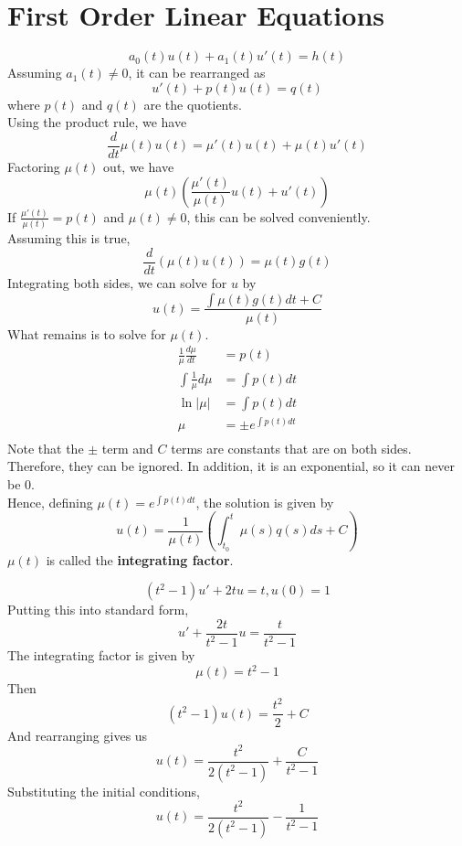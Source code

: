 \documentclass[12pt]{article}
\begin{document}
\section{First Order Linear Equations}
$$a_0(t)u(t) + a_1(t)u'(t) = h(t)$$
Assuming $a_1(t) \neq 0$, it can be rearranged as
$$u'(t) + p(t)u(t) = q(t)$$
where $p(t)$ and $q(t)$ are the quotients. \\
Using the product rule, we have
$$\frac{d}{dt} \mu(t)u(t) = \mu'(t)u(t) + \mu(t)u'(t)$$
Factoring $\mu(t)$ out, we have
$$\mu(t)\left(\frac{\mu'(t)}{\mu(t)}u(t) + u'(t)\right)$$
If $\frac{\mu'(t)}{\mu(t)} = p(t)$ and $\mu(t) \neq 0$, this can be solved conveniently. \\
Assuming this is true,
$$\frac{d}{dt} (\mu(t)u(t)) = \mu(t)g(t)$$
Integrating both sides, we can solve for $u$ by
$$u(t) = \frac{\int \mu(t)g(t)dt + C}{\mu(t)}$$
What remains is to solve for $\mu(t)$.
\begin{align*}
	\frac{1}{\mu} \frac{d\mu}{dt} &= p(t) \\
	\int \frac{1}{\mu} d\mu &= \int p(t) dt \\
	\ln|\mu| &= \int p(t) dt \\
	\mu &= \pm e^{\int p(t)dt} \\
\end{align*}
	Note that the $\pm$ term and $C$ terms are constants that are on both sides. Therefore, they can be ignored. In addition, it is an exponential, so it can never be $0$. \\
Hence, defining $\mu(t) = e^{\int p(t)dt}$, the solution is given by
$$u(t) = \frac{1}{\mu(t)} \left(\int_{t_0}^t \mu(s) q(s) ds + C\right)$$
$\mu(t)$ is called the \textbf{integrating factor}.

\begin{ex}
	$$(t^2-1)u' + 2tu = t, u(0) = 1$$
	Putting this into standard form,
	$$u' + \frac{2t}{t^2-1} u = \frac{t}{t^2-1}$$
	The integrating factor is given by
	$$\mu(t) = t^2 - 1$$
	Then
	$$(t^2-1)u(t) = \frac{t^2}{2} + C$$
	And rearranging gives us
	$$u(t) = \frac{t^2}{2(t^2-1)} + \frac{C}{t^2-1}$$
	Substituting the initial conditions,
	$$u(t) = \frac{t^2}{2(t^2-1)} - \frac{1}{t^2-1}$$
\end{ex}
\end{document}

